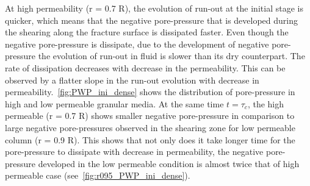 At high permeability (r = 0.7 R), the evolution of run-out at the initial stage 
is quicker, which means that the negative pore-pressure that is developed 
during the shearing along the fracture surface is dissipated faster. Even 
though the negative pore-pressure is dissipate, due to 
the development of negative pore-pressure the evolution of run-out in fluid is 
slower than its dry counterpart. The rate of dissipation decreases with 
decrease in the permeability. This can be observed by a flatter slope in the 
run-out evolution with decrease in permeability.~\cref{fig:PWP_ini_dense} shows 
the distribution of pore-pressure in high and low permeable granular media. At 
the same time $ t = \tau_c$, the high permeable (r = 0.7 R) shows smaller 
negative pore-pressure in comparison to large negative pore-pressures observed 
in the shearing zone for low permeable column (r = 0.9 R). This shows that not 
only does it take longer time for the pore-pressure to dissipate with decrease 
in permeability, the negative pore-pressure developed in the low permeable 
condition is almost twice that of high permeable case 
(see~\cref{fig:r095_PWP_ini_dense}).

